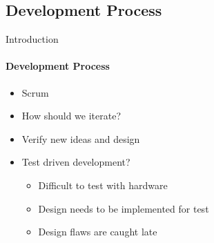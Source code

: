 \subsection{Development Process}
\begin{frame}[t]{Introduction}\framesubtitle{Development Process}
    \begin{itemize}
        \item Scrum
        \item How should we iterate?
        \item Verify new ideas and design
        \item Test driven development?
        \begin{itemize}
            \item Difficult to test with hardware
            \item Design needs to be implemented for test
            \item Design flaws are caught late
        \end{itemize}
    \end{itemize}
\end{frame}

